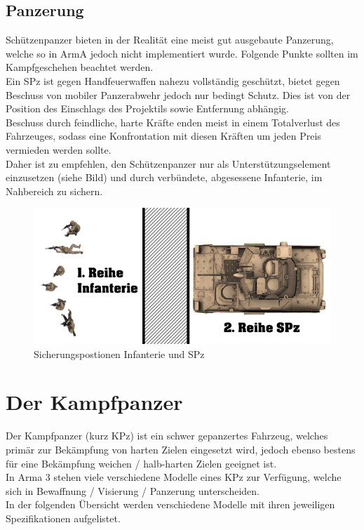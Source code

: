 \subsection{Panzerung}
	Schützenpanzer bieten in der Realität eine meist gut ausgebaute Panzerung, welche so in ArmA jedoch nicht implementiert wurde. Folgende Punkte sollten im Kampfgeschehen beachtet werden.\\

	Ein SPz ist gegen Handfeuerwaffen nahezu vollständig geschützt, bietet gegen Beschuss von mobiler Panzerabwehr jedoch nur bedingt Schutz. Dies ist von der Position des Einschlags des Projektils sowie Entfernung abhängig.\\
	Beschuss durch feindliche, harte Kräfte enden meist in einem Totalverlust des Fahrzeuges, sodass eine Konfrontation mit diesen Kräften um jeden Preis vermieden werden sollte.\\

	Daher ist zu empfehlen, den Schützenpanzer nur als Unterstützungselement einzusetzen (siehe Bild) und durch verbündete, abgesessene Infanterie, im Nahbereich zu sichern.\\
	\begin{figure}[htbp]
		\centering
		\includegraphics[width=0.95\linewidth]{./img/tutorials/spz/reihe}
		\caption{Sicherungspostionen Infanterie und SPz}
	\end{figure}

\section{Der Kampfpanzer}
	Der Kampfpanzer (kurz KPz) ist ein schwer gepanzertes Fahrzeug, welches primär zur Bekämpfung von harten Zielen eingesetzt wird, jedoch ebenso bestens für eine Bekämpfung weichen / halb-harten Zielen geeignet ist.\\

	In Arma 3 stehen viele verschiedene Modelle eines KPz zur Verfügung, welche sich in Bewaffnung / Visierung / Panzerung unterscheiden.\\
	In der folgenden Übersicht werden verschiedene Modelle mit ihren jeweiligen Spezifikationen aufgelistet.\\


